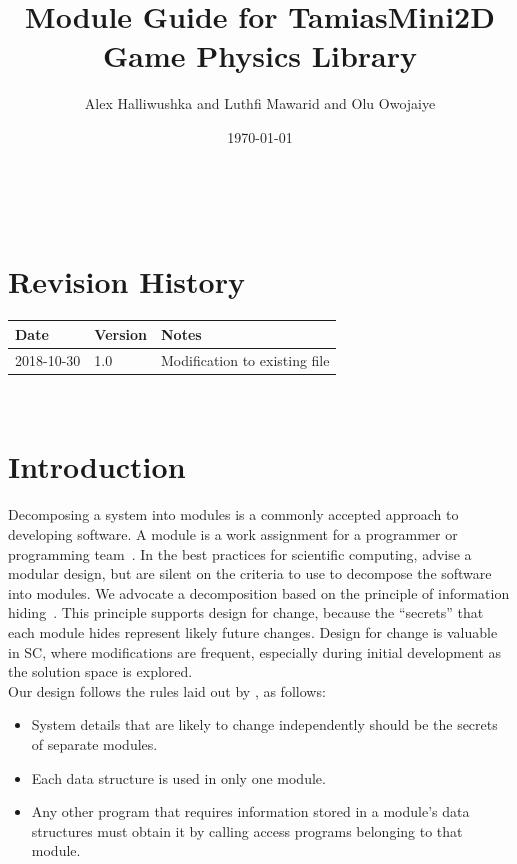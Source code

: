 \documentclass[12pt]{article}
\begin{document}
\title{Module Guide for TamiasMini2D Game Physics Library} 
\author{Alex Halliwushka and Luthfi Mawarid and Olu Owojaiye}
\date{\today}
	
\maketitle

~\newpage


\section{Revision History}

\begin{tabularx}{\textwidth}{p{3cm}p{2cm}X}
\toprule {\bf Date} & {\bf Version} & {\bf Notes}\\
\midrule
2018-10-30 & 1.0 & Modification to existing file\\
\bottomrule
\end{tabularx}

~\newpage

\tableofcontents

\listoftables

\listoffigures

\newpage



\section{Introduction}

Decomposing a system into modules is a commonly accepted approach to developing software.  A module is a work assignment for a programmer or programming team~\citep{ParnasEtAl1984}.  In the best practices for scientific computing, \citet{WilsonEtAl2013} advise a modular design, but are silent on the criteria to use to decompose the software into modules.  We advocate a decomposition based on the principle of information hiding~\citep{Parnas1972a}. This principle supports design for change, because the ``secrets'' that each module hides represent likely future changes.  Design for change is valuable in SC, where modifications are frequent, especially during initial development as the solution space is explored.  \\
\newline
Our design follows the rules laid out by \citet{ParnasEtAl1984}, as follows:
\begin{itemize}
\item System details that are likely to change independently should be the
  secrets of separate modules.
\item Each data structure is used in only one module.
\item Any other program that requires information stored in a module's data
  structures must obtain it by calling access programs belonging to that module.
\end{itemize}
\end{document}
